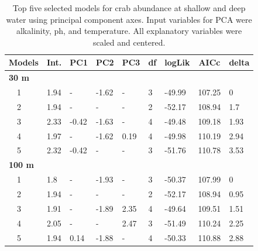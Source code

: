 \documentclass[letterpaper,12pt]{article}\usepackage[]{graphicx}\usepackage[]{color}
\begin{document}
\begin{landscape}
\centering\vspace*{\fill}
\begin{table}[!tbp]
{\scriptsize
\caption{Top five selected models for crab abundance at shallow and deep water using principal component axes. Input variables for PCA were alkalinity, ph, and temperature. All explanatory variables were scaled and centered.\label{tab:abutabpca}} 
\begin{center}
\begin{tabular}{lllllllll}
\hline\hline
\multicolumn{1}{l}{Models}&\multicolumn{1}{c}{Int.}&\multicolumn{1}{c}{PC1}&\multicolumn{1}{c}{PC2}&\multicolumn{1}{c}{PC3}&\multicolumn{1}{c}{df}&\multicolumn{1}{c}{logLik}&\multicolumn{1}{c}{AICc}&\multicolumn{1}{c}{delta}\tabularnewline
\hline
{\bfseries 30 m}&&&&&&&&\tabularnewline
~~1&1.94&-&-1.62&-&3&-49.99&107.25&0\tabularnewline
~~2&1.94&-&-&-&2&-52.17&108.94&1.7\tabularnewline
~~3&2.33&-0.42&-1.63&-&4&-49.48&109.18&1.93\tabularnewline
~~4&1.97&-&-1.62&0.19&4&-49.98&110.19&2.94\tabularnewline
~~5&2.32&-0.42&-&-&3&-51.76&110.78&3.53\tabularnewline
\hline
{\bfseries 100 m}&&&&&&&&\tabularnewline
~~1&1.8&-&-1.93&-&3&-50.37&107.99&0\tabularnewline
~~2&1.94&-&-&-&2&-52.17&108.94&0.95\tabularnewline
~~3&1.91&-&-1.89&2.35&4&-49.64&109.51&1.51\tabularnewline
~~4&2.05&-&-&2.47&3&-51.49&110.24&2.25\tabularnewline
~~5&1.94&0.14&-1.88&-&4&-50.33&110.88&2.88\tabularnewline
\hline
\end{tabular}\end{center}}
\end{table}

\end{landscape}
\end{document}
